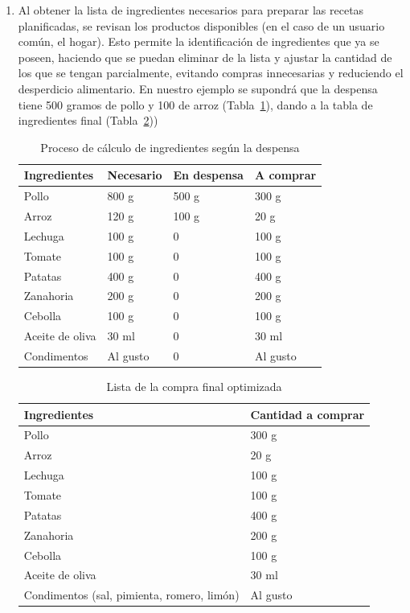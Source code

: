 \documentclass[twoside, openright, 11pt]{report}
\begin{document}
\begin{enumerate}
			\item Al obtener la lista de ingredientes necesarios para preparar las recetas planificadas, se revisan los productos disponibles (en el caso de un usuario común, el hogar). Esto permite la identificación de ingredientes que ya se poseen, haciendo que se puedan eliminar de la lista y ajustar la cantidad de los que se tengan parcialmente, evitando compras innecesarias y reduciendo el desperdicio alimentario. En nuestro ejemplo se supondrá que la despensa tiene 500 gramos de pollo y 100 de arroz (Tabla~\ref{fig:TablaCalculoIngr}), dando a la tabla de ingredientes final (Tabla~\ref{fig:TablaIngrFinal}))
			
			\begin{table}[H]
				\label{fig:TablaCalculoIngr}
				\centering
				\caption{Proceso de cálculo de ingredientes según la despensa}
				\begin{tabular}{|p{3cm}|p{3cm}|p{3cm}|p{3cm}|}
					\hline
					\textbf{Ingredientes} & \textbf{Necesario} & \textbf{En despensa} & \textbf{A comprar} \\ \hline
					Pollo & 800 g & 500 g & 300 g \\ \hline
					Arroz & 120 g & 100 g & 20 g \\ \hline
					Lechuga & 100 g & 0 & 100 g \\ \hline
					Tomate & 100 g & 0 & 100 g \\ \hline
					Patatas & 400 g & 0 & 400 g \\ \hline
					Zanahoria & 200 g & 0 & 200 g \\ \hline
					Cebolla & 100 g & 0 & 100 g \\ \hline
					Aceite de oliva & 30 ml & 0 & 30 ml \\ \hline
					Condimentos & Al gusto & 0 & Al gusto \\ \hline
				\end{tabular}
			\end{table}
		
			\begin{table}[H]
				\centering
				\label{fig:TablaIngrFinal}
				\caption{Lista de la compra final optimizada}
				\begin{tabular}{|p{5cm}|p{3cm}|}
					\hline
					\textbf{Ingredientes} & \textbf{Cantidad a comprar} \\ \hline
					Pollo & 300 g \\ \hline
					Arroz & 20 g \\ \hline
					Lechuga & 100 g \\ \hline
					Tomate & 100 g \\ \hline
					Patatas & 400 g \\ \hline
					Zanahoria & 200 g \\ \hline
					Cebolla & 100 g \\ \hline
					Aceite de oliva & 30 ml \\ \hline
					Condimentos (sal, pimienta, romero, limón) & Al gusto \\ \hline
				\end{tabular}
			\end{table}
		

\end{enumerate}
\end{document}
